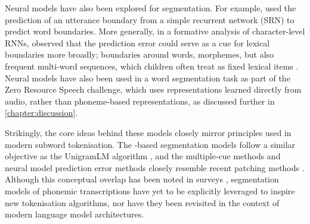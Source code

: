 
Neural models have also been explored for segmentation. For example, \citet{christiansen1998learning} used the prediction of an utterance boundary from a simple recurrent network (SRN) to predict word boundaries. More generally, in a formative analysis of character-level RNNs, \citet{elman1990finding} observed that the prediction error could serve as a cue for lexical boundaries more broadly; boundaries around words, morphemes, but also frequent multi-word sequences, which children often treat as fixed lexical items \citep{macwhinney1978}. Neural models have also been used in a word segmentation task as part of the Zero Resource Speech challenge, which uses representations learned directly from audio, rather than phoneme-based representations, as discussed further in \cref{chapter:discussion}.

Strikingly, the core ideas behind these models closely mirror principles used in modern subword tokenisation. The \ngram-based segmentation models follow a similar objective as the UnigramLM algorithm \citep{kudo-2018-unigram}, and the multiple-cue methods and neural model prediction error methods closely resemble recent patching methods \citep{pagnoni2024byte}. Although this conceptual overlap has been noted in surveys \citep{mielke2021between}, segmentation models of phonemic transcriptions have yet to be explicitly leveraged to inspire new tokenisation algorithms, nor have they been revisited in the context of modern language model architectures.




